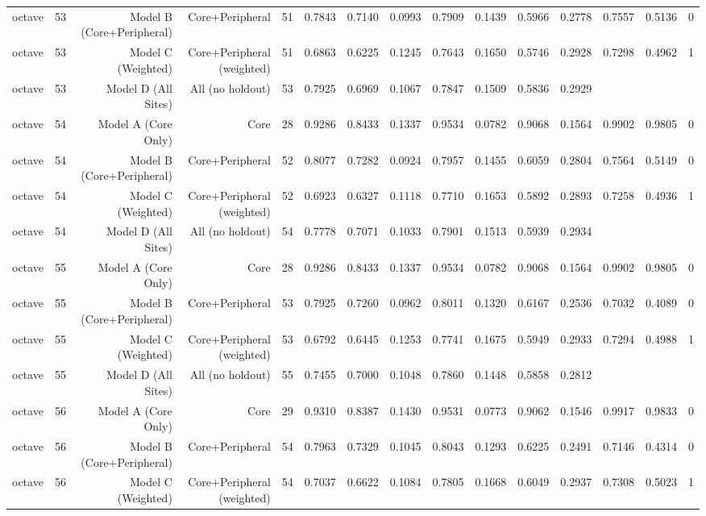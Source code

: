 {\begin{longtable}{lrrrrrrrrrrrrrr}
  octave & 53 & Model B (Core+Peripheral) & Core+Peripheral & 51 & 0.7843 & 0.7140 & 0.0993 & 0.7909 & 0.1439 & 0.5966 & 0.2778 & 0.7557 & 0.5136 & 0 \\
  octave & 53 & Model C (Weighted) & Core+Peripheral (weighted) & 51 & 0.6863 & 0.6225 & 0.1245 & 0.7643 & 0.1650 & 0.5746 & 0.2928 & 0.7298 & 0.4962 & 1 \\
  octave & 53 & Model D (All Sites) & All (no holdout) & 53 & 0.7925 & 0.6969 & 0.1067 & 0.7847 & 0.1509 & 0.5836 & 0.2929 &  &  &  \\
  octave & 54 & Model A (Core Only) & Core & 28 & 0.9286 & 0.8433 & 0.1337 & 0.9534 & 0.0782 & 0.9068 & 0.1564 & 0.9902 & 0.9805 & 0 \\
  octave & 54 & Model B (Core+Peripheral) & Core+Peripheral & 52 & 0.8077 & 0.7282 & 0.0924 & 0.7957 & 0.1455 & 0.6059 & 0.2804 & 0.7564 & 0.5149 & 0 \\
  octave & 54 & Model C (Weighted) & Core+Peripheral (weighted) & 52 & 0.6923 & 0.6327 & 0.1118 & 0.7710 & 0.1653 & 0.5892 & 0.2893 & 0.7258 & 0.4936 & 1 \\
  octave & 54 & Model D (All Sites) & All (no holdout) & 54 & 0.7778 & 0.7071 & 0.1033 & 0.7901 & 0.1513 & 0.5939 & 0.2934 &  &  &  \\
  octave & 55 & Model A (Core Only) & Core & 28 & 0.9286 & 0.8433 & 0.1337 & 0.9534 & 0.0782 & 0.9068 & 0.1564 & 0.9902 & 0.9805 & 0 \\
  octave & 55 & Model B (Core+Peripheral) & Core+Peripheral & 53 & 0.7925 & 0.7260 & 0.0962 & 0.8011 & 0.1320 & 0.6167 & 0.2536 & 0.7032 & 0.4089 & 0 \\
  octave & 55 & Model C (Weighted) & Core+Peripheral (weighted) & 53 & 0.6792 & 0.6445 & 0.1253 & 0.7741 & 0.1675 & 0.5949 & 0.2933 & 0.7294 & 0.4988 & 1 \\
  octave & 55 & Model D (All Sites) & All (no holdout) & 55 & 0.7455 & 0.7000 & 0.1048 & 0.7860 & 0.1448 & 0.5858 & 0.2812 &  &  &  \\
  octave & 56 & Model A (Core Only) & Core & 29 & 0.9310 & 0.8387 & 0.1430 & 0.9531 & 0.0773 & 0.9062 & 0.1546 & 0.9917 & 0.9833 & 0 \\
  octave & 56 & Model B (Core+Peripheral) & Core+Peripheral & 54 & 0.7963 & 0.7329 & 0.1045 & 0.8043 & 0.1293 & 0.6225 & 0.2491 & 0.7146 & 0.4314 & 0 \\
  octave & 56 & Model C (Weighted) & Core+Peripheral (weighted) & 54 & 0.7037 & 0.6622 & 0.1084 & 0.7805 & 0.1668 & 0.6049 & 0.2937 & 0.7308 & 0.5023 & 1 \\

\end{longtable}}
